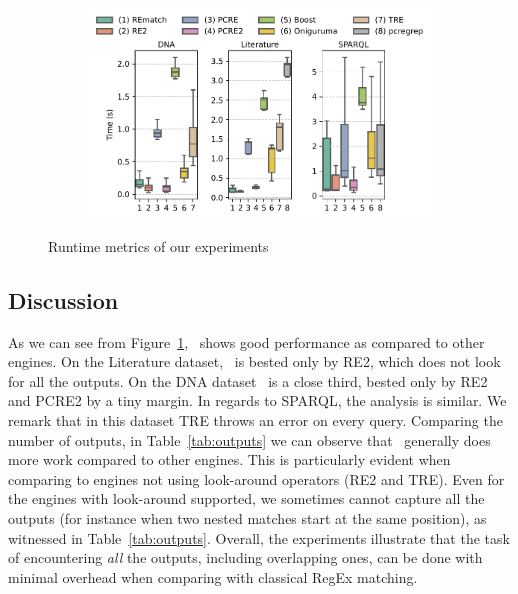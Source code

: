 \begin{figure}[t]
	\centering
	\begin{subfigure}[b]{.8\textwidth}
		\centering
		\includegraphics[width=\textwidth]{figures/lookahead-time.pdf}
	\end{subfigure}
	\caption{Runtime metrics of our experiments}
	\label{fig:comparison}
\end{figure}



\subsection{Discussion}
As we can see from Figure~\ref{fig:comparison}, \rematch\ shows good performance as compared to other engines. On
the \textsf{Literature} dataset, \rematch\ is bested only by \textsf{RE2}, which
does not look for all the outputs. On the \textsf{DNA} dataset \rematch\ is a
close third, bested only by \textsf{RE2} and \textsf{PCRE2} by a tiny margin.
In regards to \textsf{SPARQL}, the analysis is similar. We remark that in this
dataset \textsf{TRE} throws an error on every query. Comparing the number of
outputs, in Table~\ref{tab:outputs} we can observe that \rematch\ generally does
more work compared to other engines. This is particularly evident when comparing
to engines not using look-around operators (\textsf{RE2} and \textsf{TRE}). Even
for the engines with look-around supported, we sometimes cannot capture all the
outputs (for instance when two nested matches start at the same position), as
witnessed in Table~\ref{tab:outputs}. Overall, the experiments illustrate that
the task of encountering \emph{all} the outputs, including overlapping ones, can
be done with minimal overhead when comparing with classical RegEx matching.
